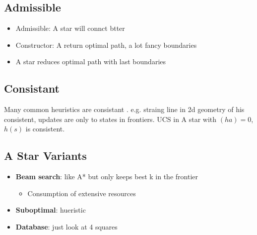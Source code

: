   \subsection{Admissible}

    \begin{itemize}
      \item Admissible: A star will connct btter
      \item Constructor:  A return optimal path, a lot fancy boundaries
      \item A star reduces optimal path with last boundaries
    \end{itemize}

  \subsection{Consistant}

    Many common heuristics are consistant . e.g. straing line in
    2d geometry of his consistent, updates are only to states in frontiers.
    UCS in A star with $ (ha) = 0 $, $ h (s) $ is consistent.

  \subsection{A Star Variants}

    \begin{itemize}
      \item \textbf{Beam search}: like A* but only keeps best k in the frontier
      \begin{itemize}
        \item Consumption of extensive resources
      \end{itemize}

      \item \textbf{Suboptimal}: hueristic
      \item \textbf{Database}: just look at 4 squares
    \end{itemize}
